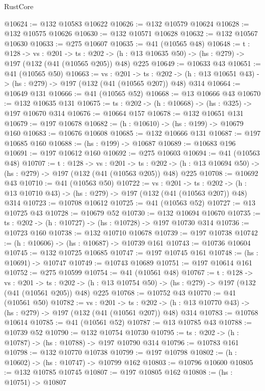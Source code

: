 \begin{lexlean}{RustCore}
\begin{coremodule}
@10624 := @132 @10583 @10622
@10626 := @132 @10579 @10624
@10628 := @132 @10575 @10626
@10630 := @132 @10571 @10628
@10632 := @132 @10567 @10630
@10633 := @275 @10607
@10635 := @41 (@10565 @48)
@10648 := {t : @128} ->
  {vs : @201} ->
  {ts : @202} -> (h : @13 @10635 @50) -> (hs : @279) -> @197 (@132 (@41 (@10565 @205)) @48) @225
@10649 := @10633 @43
@10651 := @41 (@10565 @50)
@10663 := {vs : @201} ->
  {ts : @202} -> (h : @13 @10651 @43) -> (hs : @279) -> @197 (@132 (@41 (@10565 @207)) @48) @314
@10664 := @10649 @131
@10666 := @41 (@10565 @52)
@10668 := @13 @10666 @43
@10670 := @132 @10635 @131
@10675 := {ts : @202} -> (h : @10668) -> (hs : @325) -> @197 @10670 @314
@10676 := @10664 @157
@10678 := @132 @10651 @131
@10679 := @197 @10678
@10682 := (h : @10610) -> (hs : @199) -> @10679 @160
@10683 := @10676 @10608
@10685 := @132 @10666 @131
@10687 := @197 @10685 @160
@10688 := (hs : @199) -> @10687
@10689 := @10683 @196
@10691 := @197 @10612 @160
@10692 := @275 @10603
@10694 := @41 (@10563 @48)
@10707 := {t : @128} ->
  {vs : @201} ->
  {ts : @202} -> (h : @13 @10694 @50) -> (hs : @279) -> @197 (@132 (@41 (@10563 @205)) @48) @225
@10708 := @10692 @43
@10710 := @41 (@10563 @50)
@10722 := {vs : @201} ->
  {ts : @202} -> (h : @13 @10710 @43) -> (hs : @279) -> @197 (@132 (@41 (@10563 @207)) @48) @314
@10723 := @10708 @10612
@10725 := @41 (@10563 @52)
@10727 := @13 @10725 @43
@10728 := @10679 @52
@10730 := @132 @10694 @10670
@10735 := {ts : @202} -> (h : @10727) -> (hs : @10728) -> @197 @10730 @314
@10736 := @10723 @160
@10738 := @132 @10710 @10678
@10739 := @197 @10738
@10742 := (h : @10606) -> (hs : @10687) -> @10739 @161
@10743 := @10736 @10604
@10745 := @132 @10725 @10685
@10747 := @197 @10745 @161
@10748 := (hs : @10691) -> @10747
@10749 := @10743 @10689
@10751 := @197 @10614 @161
@10752 := @275 @10599
@10754 := @41 (@10561 @48)
@10767 := {t : @128} ->
  {vs : @201} ->
  {ts : @202} -> (h : @13 @10754 @50) -> (hs : @279) -> @197 (@132 (@41 (@10561 @205)) @48) @225
@10768 := @10752 @43
@10770 := @41 (@10561 @50)
@10782 := {vs : @201} ->
  {ts : @202} -> (h : @13 @10770 @43) -> (hs : @279) -> @197 (@132 (@41 (@10561 @207)) @48) @314
@10783 := @10768 @10614
@10785 := @41 (@10561 @52)
@10787 := @13 @10785 @43
@10788 := @10739 @52
@10790 := @132 @10754 @10730
@10795 := {ts : @202} -> (h : @10787) -> (hs : @10788) -> @197 @10790 @314
@10796 := @10783 @161
@10798 := @132 @10770 @10738
@10799 := @197 @10798
@10802 := (h : @10602) -> (hs : @10747) -> @10799 @162
@10803 := @10796 @10600
@10805 := @132 @10785 @10745
@10807 := @197 @10805 @162
@10808 := (hs : @10751) -> @10807

\end{coremodule}
\end{lexlean}
